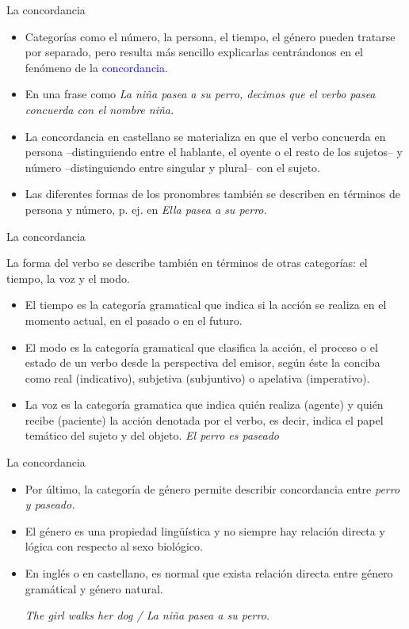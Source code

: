 \documentclass{beamer}
\begin{document}
\begin{frame}{La concordancia}

\begin{itemize}
    \item Categorías como el número, la persona, el tiempo, el género pueden tratarse por separado, pero resulta más sencillo explicarlas centrándonos en el fenómeno de la \textcolor{blue}{concordancia}.
    \item En una frase como \it{La niña pasea a su perro}, decimos que el verbo \it{pasea} concuerda con el nombre \it{niña}.
    \item La concordancia en castellano se materializa en que el verbo concuerda en persona --distinguiendo entre el hablante, el oyente o el resto de los sujetos-- y número --distinguiendo entre singular y plural-- con el sujeto.
    \item Las diferentes formas de los pronombres también se describen en términos de persona y número, p. ej. en \it{Ella pasea a su perro}. 
\end{itemize}
\end{frame}


\begin{frame}{La concordancia}

La forma del verbo se describe también en términos de otras categorías: el tiempo, la voz y el modo.

\begin{itemize}
    \item El tiempo es la categoría gramatical que indica si la acción se realiza en el momento actual, en el pasado o en el futuro.     
    \item El modo es la categoría gramatical que clasifica la acción, el proceso o el estado de un verbo desde la perspectiva del emisor, según éste la conciba como real (indicativo), subjetiva (subjuntivo) o apelativa (imperativo).
    \item La voz es la categoría gramatica que indica quién realiza (agente) y quién recibe (paciente) la acción denotada por el verbo, es decir, indica el papel temático del sujeto y del objeto. \it{El perro es paseado}
\end{itemize}
\end{frame}


\begin{frame}{La concordancia}

\begin{itemize}
    \item Por último, la categoría de género permite describir concordancia entre \it{perro} y \it{paseado}.
    \item El género es una propiedad lingüística y no siempre hay relación directa y lógica con respecto al sexo biológico. 
    \item En inglés o en castellano, es normal que exista relación directa entre género gramátical y género natural. 
    
    \it{The girl walks her dog} / \it{La niña pasea a su perro}.
\end{itemize}
\end{frame}
\end{document}
